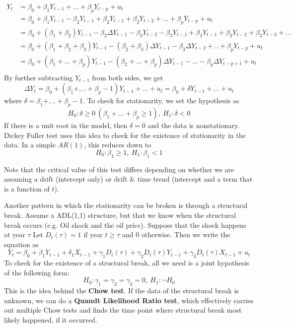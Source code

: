 \[
\begin{aligned}
 Y_t&=\beta_0 + \beta_1 Y_{t-1}+ ...+\beta_pY_{t-p}+u_t\\
 &=\beta_0 + \beta_1Y_{t-1}-\beta_2 Y_{t-1}+\beta_2Y_{t-1}+\beta_2 Y_{t-2}+...+\beta_pY_{t-p}+u_t\\
 &=\beta_0 + (\beta_1+\beta_2)Y_{t-1} -\beta_2 \Delta Y_{t-1} - \beta_3Y_{t-2}-\beta_3Y_{t-1}+\beta_3Y_{t-1}+\beta_3Y_{t-2}+\beta_3Y_{t-3}+...\\
 &=\beta_0 + (\beta_1+\beta_2+\beta_3)Y_{t-1}-(\beta_2+\beta_3)\Delta Y_{t-1} - \beta_3\Delta Y_{t-2}+ .. +\beta_pY_{t-p}+u_t
  \\
 &=\beta_0 + (\beta_1+...+\beta_p)Y_{t-1}-(\beta_2+...+\beta_p)\Delta Y_{t-1} - ... - \beta_{p}\Delta Y_{t-p+1}+u_t \\
 \end{aligned}
\]
By further subtracting $Y_{t-1}$ from both sides, we get
\[
\Delta Y_{t} = \beta_0 + (\beta_1 + ,.. +\beta_p-1) Y_{t-1}+ ... +u_t = \beta_0 + \delta Y_{t-1}+ ... +u_t 
\]
where $\delta = \beta_1 + ,.. +\beta_p-1$. To check for stationarity, we set the hypothesis as 
\[
H_0: \delta\geq0 \ (\beta_1+...+\beta_p\geq 1),\ H_1 : \delta<0 
\]
If there is a unit root in the model, then $\delta=0$ and the data is nonstationary. Dickey Fuller test uses this idea to check for the existence of stationarity in the data. In a simple $AR(1)$, this reduces down to
\[
H_0: \beta_1\geq 1,\ H_1 : \beta_1<1 
\]
\par\medskip
Note that the critical value of this test differs depending on whether we are assuming a drift (intercept only) or drift \& time trend (intercept and a term that is a function of $t$).
\par\medskip
Another pattern in which the stationarity can be broken is through a structural break. Assume a ADL(1,1) structure, but that we know when the structural break occurs (e.g. Oil shock and the oil price). Suppose that the shock happens at year $\tau$ Let $D_t(\tau)=1$ if year $t\geq\tau$ and 0 otherwise. Then we write the equation as
\[
Y_t = \beta_0 +\beta_1Y_{t-1}+\delta_1 X_{t-1} + \gamma_1 D_t(\tau)+\gamma_2 D_t(\tau)Y_{t-1}+\gamma_3 D_t(\tau)X_{t-1}+u_t
\]
To check for the existence of a structural break, all we need is a joint hypothesis of the following form:
\[
H_0: \gamma_1 = \gamma_2 = \gamma_3 =0, \ H_1: \lnot H_0
\]
This is the idea behind the \textbf{Chow test}. If the data of the structural break is unknown, we can do a \textbf{Quandt Likelihood Ratio test}, which effectively carries out multiple Chow tests and finds the time point where structural break most likely happened, if it occurred.  
